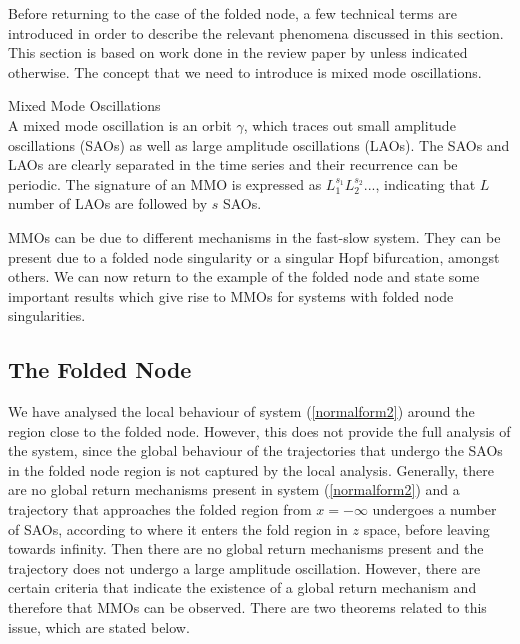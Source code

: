 \label{sec: MMO Oscilaltions} %

Before returning to the case of the folded node, a few technical terms are introduced in order to describe the relevant phenomena discussed in this section.
This section is based on work done in the review paper by \citep{MMO} unless indicated otherwise.
The concept that we need to introduce is mixed mode oscillations.

\begin{definition}{Mixed Mode Oscillations \citealp{MMO}}\\
	A mixed mode oscillation is an orbit $\gamma$, which traces out small amplitude oscillations (SAOs) as well as large amplitude oscillations (LAOs).
	The SAOs and LAOs are clearly separated in the time series and their recurrence can be periodic.
	The signature of an MMO is expressed as $L_1^{s_1}L_2^{s_2}...$, indicating that $L$ number of LAOs are followed by $s$ SAOs.
\end{definition}
MMOs can be due to different mechanisms in the fast-slow system. They can be present due to a folded node singularity or a singular Hopf bifurcation, amongst others. We can now return to the example of the folded node and state some important results which give rise to MMOs for systems with folded node singularities.

\subsection{The Folded Node}
We have analysed the local behaviour of system (\ref{normalform2}) around the region close to the folded node.
However, this does not provide the full analysis of the system, since the global behaviour of the trajectories that undergo the SAOs in the folded node region is not captured by the local analysis.
Generally, there are no global return mechanisms present in system (\ref{normalform2}) and a trajectory that approaches the folded region from $x = - \infty$ undergoes a number of SAOs, according to where it enters the fold region in $z$ space, before leaving towards infinity. Then there are no global return mechanisms present and the trajectory does not undergo a large amplitude oscillation. However, there are certain criteria that indicate the existence of a global return mechanism and therefore that MMOs can be observed. There are two theorems related to this issue, which are stated below.

